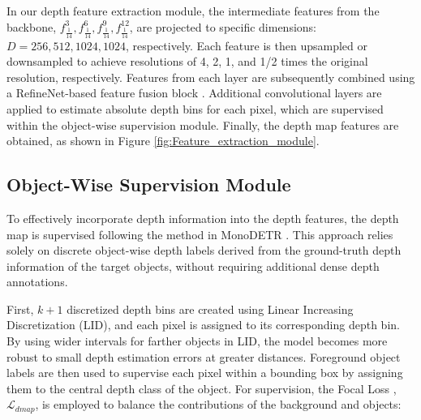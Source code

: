 In our depth feature extraction module, the intermediate features from the backbone, $f_{\frac{1}{14}}^3, f_{\frac{1}{14}}^6, f_{\frac{1}{14}}^9, f_{\frac{1}{14}}^{12}$, are projected to specific dimensions: $D = 256, 512, 1024, 1024$, respectively. Each feature is then upsampled or downsampled to achieve resolutions of 4, 2, 1, and 1/2 times the original resolution, respectively. Features from each layer are subsequently combined using a RefineNet-based feature fusion block \cite{lin2017refinenet, xian2018monocular}. Additional convolutional layers are applied to estimate absolute depth bins for each pixel, which are supervised within the object-wise supervision module. Finally, the depth map features are obtained, as shown in Figure \ref{fig:Feature_extraction_module}.

\subsection{Object-Wise Supervision Module}
To effectively incorporate depth information into the depth features, the depth map is supervised following the method in MonoDETR \cite{zhang2023monodetr}. This approach relies solely on discrete object-wise depth labels derived from the ground-truth depth information of the target objects, without requiring additional dense depth annotations.

First, $k+1$ discretized depth bins are created using Linear Increasing Discretization (LID)\cite{reading2021categorical}, and each pixel is assigned to its corresponding depth bin.
By using wider intervals for farther objects in LID, the model becomes more robust to small depth estimation errors at greater distances. Foreground object labels are then used to supervise each pixel within a bounding box by assigning them to the central depth class of the object. For supervision, the Focal Loss \cite{lin2017focal}, $\mathcal{L}_{dmap}$, is employed to balance the contributions of the background and objects:

